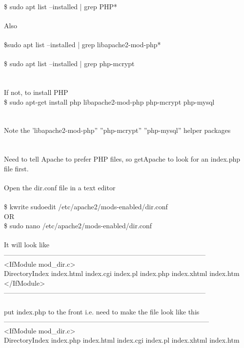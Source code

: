 \documentclass[10pt,a4paper]{article}
\begin{document}
{{{{{{{{{{{{{{{{\\
\$ sudo apt list --installed | grep  PHP*\\
\\
Also\\
\\
\$sudo apt list --installed | grep  libapache2-mod-php*\\
\\
\$ sudo apt list --installed | grep php-mcrypt\\
\\
\\
If not, to install PHP\\
\$ sudo apt-get install php libapache2-mod-php php-mcrypt php-mysql\\
\\
\\
Note the 'libapache2-mod-php''  ''php-mcrypt''   ''php-mysql''  helper packages\\
\\
\\
Need to tell Apache to prefer PHP files, so getApache to look for an index.php file first.\\
\\
Open the dir.conf file in a text editor\\
\\
\$ kwrite sudoedit /etc/apache2/mods-enabled/dir.conf}{\large \\
OR\\
\$ sudo nano /etc/apache2/mods-enabled/dir.conf}{\large \\
\\
It will look like\\
-----------------------------------------------------------------------------------------\\
<IfModule mod\_dir.c>\\
    DirectoryIndex index.html index.cgi index.pl index.php index.xhtml index.htm\\
</IfModule>\\
-----------------------------------------------------------------------------------------\\
\\
put index.php to the front i.e. need to make the file look like this\\
------------------------------------------------------------------------------------------\\
<IfModule mod\_dir.c>\\
    DirectoryIndex index.php index.html index.cgi index.pl index.xhtml index.htm\\
}}}}}}}}}}}}}}}}
\end{document}
